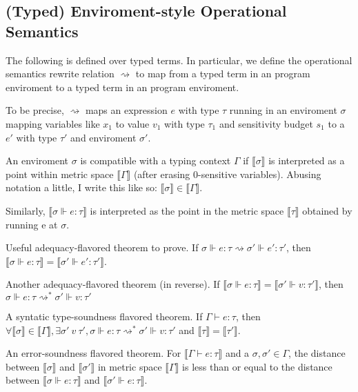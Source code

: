 \subsection{(Typed) Enviroment-style Operational Semantics}
The following is defined over typed terms. In particular, we define the
operational semantics rewrite relation $\rightsquigarrow$ to map from a typed
term in an program enviroment to a typed term in an program enviroment.

To be precise, $\rightsquigarrow$ maps an expression $e$ with type $\tau$
running in an enviroment $\sigma$ mapping variables like $x_1$ to value $v_1$
with type $\tau_1$ and sensitivity budget $s_1$ to a $e'$ with type $\tau'$ and
enviroment $\sigma'$.

An enviroment $\sigma$ is compatible with a typing context $\Gamma$ if
$\llbracket \sigma \rrbracket$ is interpreted as a point within metric space
$\llbracket \Gamma \rrbracket$ (after erasing $0$-sensitive variables). Abusing
notation a little, I write this like so: $\llbracket \sigma \rrbracket \in
\llbracket \Gamma \rrbracket$.

Similarly, $\llbracket \sigma \Vdash e : \tau \rrbracket$ is
interpreted as the point in the metric space $\llbracket \tau \rrbracket$
obtained by running e at $\sigma$.

Useful adequacy-flavored theorem to prove. If $\sigma \Vdash e : \tau \rightsquigarrow \sigma'
\Vdash e' : \tau'$, then $\llbracket \sigma \Vdash e : \tau \rrbracket =
\llbracket \sigma' \Vdash e' : \tau' \rrbracket$.

Another adequacy-flavored theorem (in reverse). If $\llbracket \sigma \Vdash e :
\tau \rrbracket = \llbracket \sigma' \Vdash v : \tau' \rrbracket$, then $\sigma
\Vdash e : \tau \rightsquigarrow^{*} \sigma' \Vdash v : \tau'$

A syntatic type-soundness flavored theorem. If $\Gamma \vdash e : \tau$, then
$\forall \llbracket \sigma \rrbracket \in \llbracket \Gamma \rrbracket, \exists
\sigma' \ v \ \tau', \sigma \Vdash e : \tau \rightsquigarrow^{*} \sigma' \Vdash v :
\tau'$ and $\llbracket \tau \rrbracket = \llbracket \tau' \rrbracket$.

An error-soundness flavored theorem. For $\llbracket \Gamma \vdash e : \tau
\rrbracket$ and a $\sigma, \sigma' \in \Gamma$, the distance between $\llbracket
\sigma \rrbracket$ and $\llbracket \sigma' \rrbracket$ in metric space
$\llbracket \Gamma \rrbracket$ is less than or equal to the distance between
$\llbracket \sigma \Vdash e : \tau \rrbracket$ and $\llbracket \sigma' \Vdash e
: \tau \rrbracket$.


